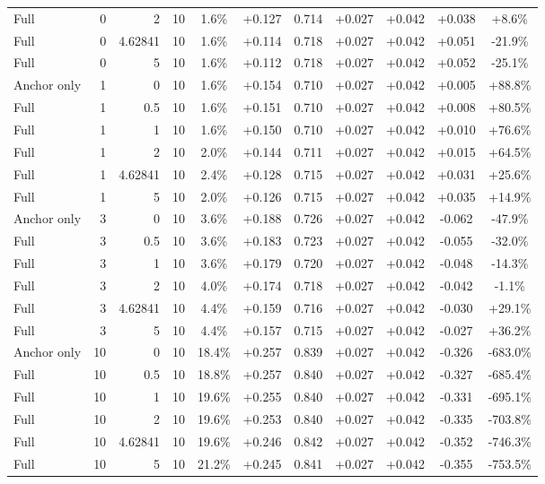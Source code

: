 \begin{table}[htbp]
\begin{tabular}{lrrrccccccc}
Full & 0 & 2 & 10 & 1.6\% & +0.127 & 0.714 & +0.027 & +0.042 & +0.038 & +8.6\% \\
Full & 0 & 4.62841 & 10 & 1.6\% & +0.114 & 0.718 & +0.027 & +0.042 & +0.051 & -21.9\% \\
Full & 0 & 5 & 10 & 1.6\% & +0.112 & 0.718 & +0.027 & +0.042 & +0.052 & -25.1\% \\
Anchor only & 1 & 0 & 10 & 1.6\% & +0.154 & 0.710 & +0.027 & +0.042 & +0.005 & +88.8\% \\
Full & 1 & 0.5 & 10 & 1.6\% & +0.151 & 0.710 & +0.027 & +0.042 & +0.008 & +80.5\% \\
Full & 1 & 1 & 10 & 1.6\% & +0.150 & 0.710 & +0.027 & +0.042 & +0.010 & +76.6\% \\
Full & 1 & 2 & 10 & 2.0\% & +0.144 & 0.711 & +0.027 & +0.042 & +0.015 & +64.5\% \\
Full & 1 & 4.62841 & 10 & 2.4\% & +0.128 & 0.715 & +0.027 & +0.042 & +0.031 & +25.6\% \\
Full & 1 & 5 & 10 & 2.0\% & +0.126 & 0.715 & +0.027 & +0.042 & +0.035 & +14.9\% \\
Anchor only & 3 & 0 & 10 & 3.6\% & +0.188 & 0.726 & +0.027 & +0.042 & -0.062 & -47.9\% \\
Full & 3 & 0.5 & 10 & 3.6\% & +0.183 & 0.723 & +0.027 & +0.042 & -0.055 & -32.0\% \\
Full & 3 & 1 & 10 & 3.6\% & +0.179 & 0.720 & +0.027 & +0.042 & -0.048 & -14.3\% \\
Full & 3 & 2 & 10 & 4.0\% & +0.174 & 0.718 & +0.027 & +0.042 & -0.042 & -1.1\% \\
Full & 3 & 4.62841 & 10 & 4.4\% & +0.159 & 0.716 & +0.027 & +0.042 & -0.030 & +29.1\% \\
Full & 3 & 5 & 10 & 4.4\% & +0.157 & 0.715 & +0.027 & +0.042 & -0.027 & +36.2\% \\
Anchor only & 10 & 0 & 10 & 18.4\% & +0.257 & 0.839 & +0.027 & +0.042 & -0.326 & -683.0\% \\
Full & 10 & 0.5 & 10 & 18.8\% & +0.257 & 0.840 & +0.027 & +0.042 & -0.327 & -685.4\% \\
Full & 10 & 1 & 10 & 19.6\% & +0.255 & 0.840 & +0.027 & +0.042 & -0.331 & -695.1\% \\
Full & 10 & 2 & 10 & 19.6\% & +0.253 & 0.840 & +0.027 & +0.042 & -0.335 & -703.8\% \\
Full & 10 & 4.62841 & 10 & 19.6\% & +0.246 & 0.842 & +0.027 & +0.042 & -0.352 & -746.3\% \\
Full & 10 & 5 & 10 & 21.2\% & +0.245 & 0.841 & +0.027 & +0.042 & -0.355 & -753.5\% \\

\end{tabular}
\end{table}

